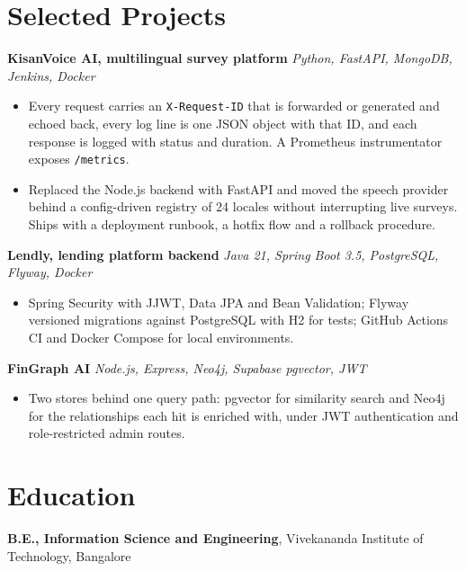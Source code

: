 \documentclass[10pt,a4paper]{article}
\begin{document}
\section{Selected Projects}
\textbf{KisanVoice AI, multilingual survey platform} \textit{Python, FastAPI, MongoDB, Jenkins, Docker}
\begin{itemize}
  \item Every request carries an \texttt{X-Request-ID} that is forwarded or generated and echoed back,
        every log line is one JSON object with that ID, and each response is logged with status and
        duration. A Prometheus instrumentator exposes \texttt{/metrics}.
  \item Replaced the Node.js backend with FastAPI and moved the speech provider behind a
        config-driven registry of 24 locales without interrupting live surveys. Ships with a
        deployment runbook, a hotfix flow and a rollback procedure.
\end{itemize}

\vspace{1pt}
\textbf{Lendly, lending platform backend} \textit{Java 21, Spring Boot 3.5, PostgreSQL, Flyway, Docker}
\begin{itemize}
  \item Spring Security with JJWT, Data JPA and Bean Validation; Flyway versioned migrations against
        PostgreSQL with H2 for tests; GitHub Actions CI and Docker Compose for local environments.
\end{itemize}

\vspace{1pt}
\textbf{FinGraph AI} \textit{Node.js, Express, Neo4j, Supabase pgvector, JWT}
\begin{itemize}
  \item Two stores behind one query path: pgvector for similarity search and Neo4j for the
        relationships each hit is enriched with, under JWT authentication and role-restricted
        admin routes.
\end{itemize}

\section{Education}
\textbf{B.E., Information Science and Engineering}, Vivekananda Institute of Technology, Bangalore
\end{document}
